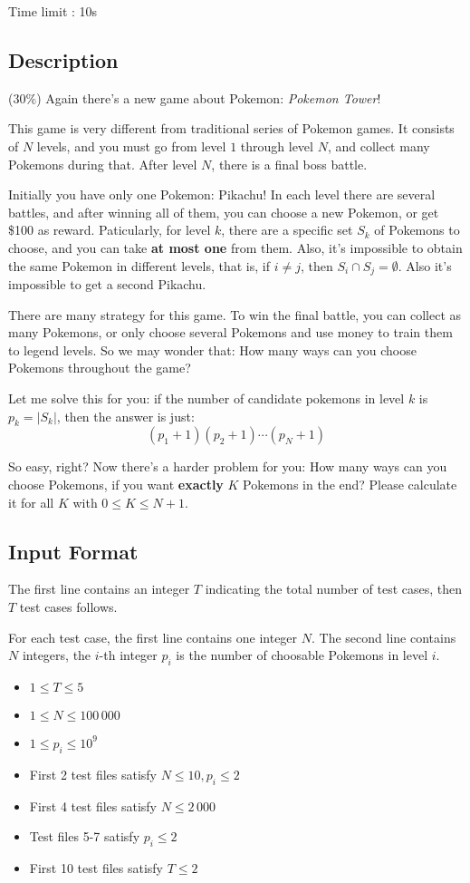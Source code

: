 Time limit : 10s
\subsection{Description}\label{description}

($30\%$) Again there's a new game about Pokemon: {\it Pokemon Tower}!

This game is very different from traditional series of Pokemon games. It consists of $N$ levels, and you must go from level $1$ through level $N$, and collect many Pokemons during that. After level $N$, there is a final boss battle.

Initially you have only one Pokemon: Pikachu! 
In each level there are several battles, and after winning all of them, you can choose a new Pokemon, or get \$100 as reward. 
Paticularly, for level $k$, there are a specific set $S_k$ of Pokemons to choose, and you can take {\bf at most one} from them. Also, it's impossible to obtain the same Pokemon in different levels, that is, if $i \neq j$, then $S_i \cap S_j = \emptyset$. Also it's impossible to get a second Pikachu.

There are many strategy for this game. To win the final battle, you can collect as many Pokemons, or only choose several Pokemons and use money to train them to legend levels. So we may wonder that: How many ways can you choose Pokemons throughout the game?

Let me solve this for you: if the number of candidate pokemons in level $k$ is $p_k = |S_k|$, then the answer is just:
$$(p_1 + 1)(p_2 + 1) \cdots (p_N + 1)$$

So easy, right? Now there's a harder problem for you: How many ways can you choose Pokemons, if you want {\bf exactly} $K$ Pokemons in the end? Please calculate it for all $K$ with $0 \leq K \leq N+1$.

\subsection{Input Format}\label{input-format}

The first line contains an integer \(T\) indicating the total number of
test cases, then $T$ test cases follows.

For each test case, the first line contains one integer $N$.
The second line contains $N$ integers, the $i$-th integer $p_i$ is the number of choosable Pokemons in level $i$.

\begin{itemize}
\tightlist
\item
  \(1 \le T \le 5\)
\item
  \(1 \le N \le 100\,000\)
\item
  \(1 \le p_i \le 10^9\)
\item
  First 2 test files satisfy \(N \le 10, p_i \le 2\)
\item
  First 4 test files satisfy \(N \le 2\,000\)
\item
  Test files 5-7 satisfy \(p_i \le 2\)
\item
  First 10 test files satisfy \(T \le 2\)
\end{itemize}

